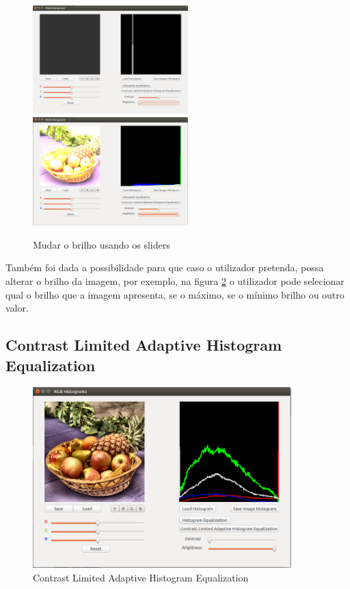 \documentclass[pdftex,12pt,a4paper]{report}
\begin{document}
\begin{figure}[!htb]
\center
 \includegraphics[width=60mm,scale=1]{imagens/low_brigh.png}
 \includegraphics[width=60mm,scale=1]{imagens/high_brigh.png}
 \caption{Mudar o brilho usando os sliders}
 \label{fig:brilho}
\end{figure}

Também foi dada a possibilidade para que caso o utilizador pretenda, possa alterar o brilho da imagem, por exemplo, na figura \ref{fig:brilho} o utilizador pode selecionar qual o brilho que a imagem apresenta, se o máximo, se o mínimo brilho ou outro valor.

\subsection{Contrast Limited Adaptive Histogram Equalization}

\begin{figure}[!htb]
\center
 \includegraphics[width=100mm,scale=1]{imagens/window_contrast_limited_ada_contrast.png}
 \caption{Contrast Limited Adaptive Histogram Equalization}
 \label{fig:brilho}
\end{figure}
\end{document}
